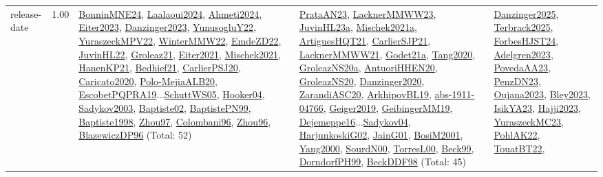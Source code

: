 {\begin{longtable}{p{3cm}r>{\raggedright\arraybackslash}p{6cm}>{\raggedright\arraybackslash}p{6cm}>{\raggedright\arraybackslash}p{8cm}}
\index{release-date}\index{Concepts!release-date}release-date &  1.00 & \hyperref[detail:BonninMNE24]{BonninMNE24}, \hyperref[detail:Laalaoui2024]{Laalaoui2024}, \hyperref[detail:Ahmeti2024]{Ahmeti2024}, \hyperref[detail:Eiter2023]{Eiter2023}, \hyperref[detail:Danzinger2023]{Danzinger2023}, \hyperref[detail:YunusogluY22]{YunusogluY22}, \hyperref[detail:YuraszeckMPV22]{YuraszeckMPV22}, \hyperref[detail:WinterMMW22]{WinterMMW22}, \hyperref[detail:EmdeZD22]{EmdeZD22}, \hyperref[detail:JuvinHL22]{JuvinHL22}, \hyperref[detail:Groleaz21]{Groleaz21}, \hyperref[detail:Eiter2021]{Eiter2021}, \hyperref[detail:Mischek2021]{Mischek2021}, \hyperref[detail:HanenKP21]{HanenKP21}, \hyperref[detail:Bedhief21]{Bedhief21}, \hyperref[detail:CarlierPSJ20]{CarlierPSJ20}, \hyperref[detail:Caricato2020]{Caricato2020}, \hyperref[detail:Polo-MejiaALB20]{Polo-MejiaALB20}, \hyperref[detail:EscobetPQPRA19]{EscobetPQPRA19}...\hyperref[detail:SchuttWS05]{SchuttWS05}, \hyperref[detail:Hooker04]{Hooker04}, \hyperref[detail:Sadykov2003]{Sadykov2003}, \hyperref[detail:Baptiste02]{Baptiste02}, \hyperref[detail:BaptistePN99]{BaptistePN99}, \hyperref[detail:Baptiste1998]{Baptiste1998}, \hyperref[detail:Zhou97]{Zhou97}, \hyperref[detail:Colombani96]{Colombani96}, \hyperref[detail:Zhou96]{Zhou96}, \hyperref[detail:BlazewiczDP96]{BlazewiczDP96} (Total: 52) & \hyperref[detail:PrataAN23]{PrataAN23}, \hyperref[detail:LacknerMMWW23]{LacknerMMWW23}, \hyperref[detail:JuvinHL23a]{JuvinHL23a}, \hyperref[detail:Mischek2021a]{Mischek2021a}, \hyperref[detail:ArtiguesHQT21]{ArtiguesHQT21}, \hyperref[detail:CarlierSJP21]{CarlierSJP21}, \hyperref[detail:LacknerMMWW21]{LacknerMMWW21}, \hyperref[detail:Godet21a]{Godet21a}, \hyperref[detail:Tang2020]{Tang2020}, \hyperref[detail:GroleazNS20a]{GroleazNS20a}, \hyperref[detail:AntuoriHHEN20]{AntuoriHHEN20}, \hyperref[detail:GroleazNS20]{GroleazNS20}, \hyperref[detail:Danzinger2020]{Danzinger2020}, \hyperref[detail:ZarandiASC20]{ZarandiASC20}, \hyperref[detail:ArkhipovBL19]{ArkhipovBL19}, \hyperref[detail:abs-1911-04766]{abs-1911-04766}, \hyperref[detail:Geiger2019]{Geiger2019}, \hyperref[detail:GeibingerMM19]{GeibingerMM19}, \hyperref[detail:Dejemeppe16]{Dejemeppe16}...\hyperref[detail:Sadykov04]{Sadykov04}, \hyperref[detail:HarjunkoskiG02]{HarjunkoskiG02}, \hyperref[detail:JainG01]{JainG01}, \hyperref[detail:BosiM2001]{BosiM2001}, \hyperref[detail:Yang2000]{Yang2000}, \hyperref[detail:SourdN00]{SourdN00}, \hyperref[detail:TorresL00]{TorresL00}, \hyperref[detail:Beck99]{Beck99}, \hyperref[detail:DorndorfPH99]{DorndorfPH99}, \hyperref[detail:BeckDDF98]{BeckDDF98} (Total: 45) & \hyperref[detail:Danzinger2025]{Danzinger2025}, \hyperref[detail:Terbrack2025]{Terbrack2025}, \hyperref[detail:ForbesHJST24]{ForbesHJST24}, \hyperref[detail:Adelgren2023]{Adelgren2023}, \hyperref[detail:PovedaAA23]{PovedaAA23}, \hyperref[detail:PenzDN23]{PenzDN23}, \hyperref[detail:Oujana2023]{Oujana2023}, \hyperref[detail:Bley2023]{Bley2023}, \hyperref[detail:IsikYA23]{IsikYA23}, \hyperref[detail:Hajji2023]{Hajji2023}, \hyperref[detail:YuraszeckMC23]{YuraszeckMC23}, \hyperref[detail:PohlAK22]{PohlAK22}, \hyperref[detail:TouatBT22]{TouatBT22}, 
\end{longtable}}
